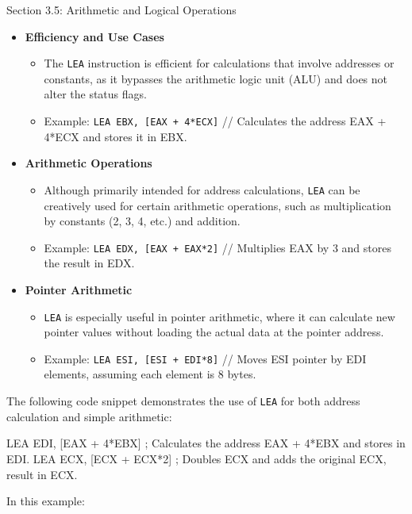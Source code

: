 \begin{notes}{Section 3.5: Arithmetic and Logical Operations}
    \begin{itemize}
        \item \textbf{Efficiency and Use Cases}
        \begin{itemize}
            \item The \texttt{LEA} instruction is efficient for calculations that involve addresses or constants, as it bypasses the arithmetic logic unit (ALU) and does not alter the status flags.
            \item Example: \texttt{LEA EBX, [EAX + 4*ECX]} // Calculates the address EAX + 4*ECX and stores it in EBX.
        \end{itemize}
        \item \textbf{Arithmetic Operations}
        \begin{itemize}
            \item Although primarily intended for address calculations, \texttt{LEA} can be creatively used for certain arithmetic operations, such as multiplication by constants (2, 3, 4, etc.) and addition.
            \item Example: \texttt{LEA EDX, [EAX + EAX*2]} // Multiplies EAX by 3 and stores the result in EDX.
        \end{itemize}
        \item \textbf{Pointer Arithmetic}
        \begin{itemize}
            \item \texttt{LEA} is especially useful in pointer arithmetic, where it can calculate new pointer values without loading the actual data at the pointer address.
            \item Example: \texttt{LEA ESI, [ESI + EDI*8]} // Moves ESI pointer by EDI elements, assuming each element is 8 bytes.
        \end{itemize}
    \end{itemize}
    
    \begin{highlight}
        The following code snippet demonstrates the use of \texttt{LEA} for both address calculation and simple arithmetic:
    
    \begin{code}[Assembly]
    LEA EDI, [EAX + 4*EBX]    ; Calculates the address EAX + 4*EBX and stores in EDI.
    LEA ECX, [ECX + ECX*2]    ; Doubles ECX and adds the original ECX, result in ECX.
    \end{code}
    
        In this example:
    

\end{highlight}
\end{notes}
